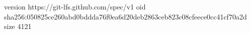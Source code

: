 version https://git-lfs.github.com/spec/v1
oid sha256:050825ce260abd0bddda76f0ea6d20deb2863ceb823c08cfeece0cc41cf70a2d
size 4121
